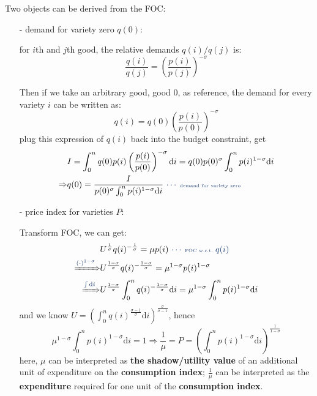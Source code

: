 \documentclass[10pt,landscape,a4paper]{article}
\begin{document}
\begin{multicols*}{3}
Two objects can be derived from the FOC:
\begin{itemize}
    \item[-] demand for variety zero $q(0)$: 
    
    for $i$th and $j$th good, the relative demands $q(i)/q(j)$ is:
$$ \frac{q(i)}{q(j)} = \left( \frac{p(i)}{p(j)} \right)^{-\sigma} $$

    Then if we take an arbitrary good, good 0, as reference, the demand for every variety $i$ can be written as:
    $$
    q(i) = q(0)\left(\frac{p(i)}{p(0)} \right)^{-\sigma}
    $$
    plug this expression of $q(i)$ back into the budget constraint, get
    \begin{align*}
        & I=\int^n_0 q(0)p(i)\left(\frac{p(i)}{p(0)} \right)^{-\sigma} \mathrm{d}i 
    =q(0)p(0)^{\sigma} \int^n_0 p(i)^{1-\sigma}\mathrm{d}i\\
    \Rightarrow & q(0)=\frac{I}{p(0)^{\sigma} \int^n_0 p(i)^{1-\sigma}\mathrm{d}i}\ {\color{myblue}\cdots \tiny{\text{ demand for variety zero}}}
    \end{align*}

    \item[-] price index for varieties $P$:
    
    Transform FOC, we can get:
    \begin{align*}
        &U^{\frac{1}{\sigma}}q(i)^{-\frac{1}{\sigma}}=\mu p(i)\ {\color{myblue}\cdots \tiny{\text{ FOC w.r.t. }q(i)}}\\
        \xRightarrow{{\color{myblue}(\cdot)^{1-\sigma}}}& U^{\frac{1-\sigma}{\sigma}}q(i)^{-\frac{1-\sigma}{\sigma}}=\mu ^{1-\sigma}p(i)^{1-\sigma}\\
        \xRightarrow{{\color{myblue}\int\mathrm{d}i}} & U^{\frac{1-\sigma}{\sigma}} \int^n_0 q(i)^{-\frac{1-\sigma}{\sigma}}\mathrm{d}i=\mu ^{1-\sigma} \int^n_0 p(i)^{1-\sigma}\mathrm{d}i
    \end{align*}
    and we know $U=\left(\int^n_0 q(i)^{\frac{\sigma-1}{\sigma}}\mathrm{d}i\right)^{\frac{\sigma}{\sigma-1}}$, hence
    $$
    \mu^{1-\sigma}\int^n_0 p(i)^{1-\sigma}\mathrm{d}i=1\Rightarrow \frac{1}{\mu}=P=\left( \int^n_0 p(i)^{1-\sigma}\mathrm{d}i \right)^{\frac{1}{1-\sigma}}
    $$
    here, $\mu$ can be interpreted as {\color{myblue}\textbf{the shadow/utility value}} of an additional unit of expenditure on the {\color{myblue}\textbf{consumption index}}; $\frac{1}{\mu}$ can be interpreted as the {\color{myblue}\textbf{expenditure}} required for one unit of the {\color{myblue}\textbf{consumption index}}.
\end{itemize}


\end{multicols*}
\end{document}
